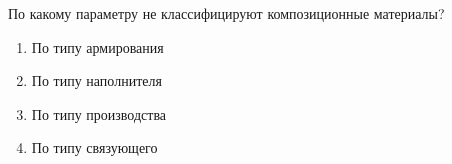 
По какому параметру не классифицируют композиционные материалы? 

\begin{enumerate}
    \item По типу армирования
    \item По типу наполнителя
    \item По типу производства
    \item По типу связующего
\end{enumerate}